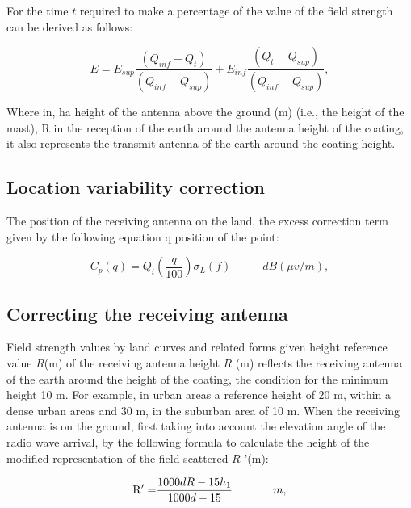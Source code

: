 \documentclass[runningheads,a4paper]{llncs}
\begin{document}
{For the time $t$ required to make a percentage of the value of the field strength can be derived as follows:

\begin{equation}
E = {E_{sup}}\frac{{({Q_{inf}} - {Q_t})}}{{({Q_{inf}} - {Q_{sup}})}} + {E_{inf}}\frac{{({Q_t} - {Q_{sup}})}}{{({Q_{inf}} - {Q_{sup}})}}, \label{keurough} \end{equation}

Where in, ha height of the antenna above the ground (m) (i.e., the height of the mast), R in the reception of the earth around the antenna height of the coating, it also represents the transmit antenna of the earth around the coating height.


\subsection{Location variability correction}

The position of the receiving antenna on the land, the excess correction term given by the following equation q position of the point:

\begin{equation}
{C_p}(q) = {Q_i}(\frac{q}{{100}}){\sigma _L}(f)\;\;\;\;\;\;\;\;\;\;dB(\mu v/m), \label{keurough} \end{equation}


\subsection{Correcting the receiving antenna}

Field strength values by land curves and related forms given height reference value $R$(m) of the receiving antenna height $R$ (m) reflects the receiving antenna of the earth around the height of the coating, the condition for the minimum height 10 m. For example, in urban areas a reference height of 20 m, within a dense urban areas and 30 m, in the suburban area of 10 m. 
When the receiving antenna is on the ground, first taking into account the elevation angle of the radio wave arrival, by the following formula to calculate the height of the modified representation of the field scattered $R$ '(m):

\begin{equation}
{\rm{R' = }}\frac{{1000dR - 15{h_1}}}{{1000d - 15}}{\kern 1pt} {\kern 1pt} {\kern 1pt} {\kern 1pt} {\kern 1pt} {\kern 1pt} {\kern 1pt} {\kern 1pt} {\kern 1pt} {\kern 1pt} {\kern 1pt} {\kern 1pt} {\kern 1pt} {\kern 1pt} {\kern 1pt} {\kern 1pt} {\kern 1pt} {\kern 1pt} {\kern 1pt} {\kern 1pt} {\kern 1pt} {\kern 1pt} {\kern 1pt} {\kern 1pt} {\kern 1pt} {\kern 1pt} {\kern 1pt} {\kern 1pt} {\kern 1pt} {\kern 1pt} {\kern 1pt} {\kern 1pt} {\kern 1pt} {\kern 1pt} {\kern 1pt} {\kern 1pt} m, \label{keurough} \end{equation}

}
\end{document}
